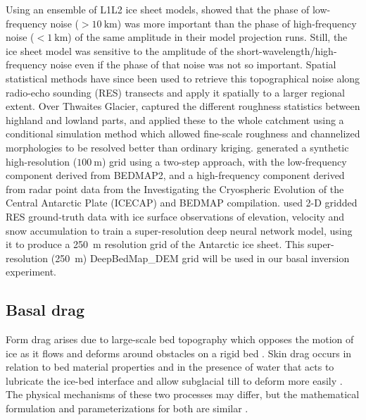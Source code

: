 Using an ensemble of L1L2 \citep{Hindmarshnumericalcomparisonapproximations2004,SchoofThinFilmFlowsWall2010} ice sheet models, \citet{SunDynamicresponseAntarctic2014} showed that the phase of low-frequency noise ($>\SI{10}{\kilo\metre}$) was more important than the phase of high-frequency noise ($<\SI{1}{\kilo\metre}$) of the same amplitude in their model projection runs.
Still, the ice sheet model was sensitive to the amplitude of the short-wavelength/high-frequency noise even if the phase of that noise was not so important.
Spatial statistical methods have since been used to retrieve this topographical noise along radio-echo sounding (\gls{RES}) transects and apply it spatially to a larger regional extent.
Over Thwaites Glacier, \citet{GoffConditionalsimulationThwaites2014} captured the different roughness statistics between highland and lowland parts, and applied these to the whole catchment using a conditional simulation method which allowed fine-scale roughness and channelized morphologies to be resolved better than ordinary kriging.
\citet{Grahamhighresolutionsyntheticbed2017} generated a synthetic high-resolution ($\SI{100}{\metre}$) grid using a two-step approach, with the low-frequency component derived from BEDMAP2, and a high-frequency component derived from radar point data from the Investigating the Cryospheric Evolution of the Central Antarctic Plate (ICECAP) and BEDMAP compilation.
\citet{LeongDeepBedMapsuperresolutiondeep2019} used 2-D gridded \gls{RES} ground-truth data with ice surface observations of elevation, velocity and snow accumulation to train a super-resolution deep neural network model, using it to produce a \SI{250}{\metre} resolution grid of the Antarctic ice sheet.
This super-resolution (\SI{250}{\metre}) DeepBedMap\_DEM grid \citep[version 1.1,][]{LeongDeepBedMap2020} will be used in our basal inversion experiment.



\subsection{Basal drag}


Form drag arises due to large-scale bed topography which opposes the motion of ice as it flows and deforms around obstacles on a rigid bed \citep[][]{WeertmanSlidingGlaciers1957,SchoofBasalperturbationsice2002}.
Skin drag occurs in relation to bed material properties and in the presence of water that acts to lubricate the ice-bed interface and allow subglacial till to deform more easily \citep{IversonExperimentsdynamicssedimentary2015}.
The physical mechanisms of these two processes may differ, but the mathematical formulation and parameterizations for both are similar \citep{Minchewuniversalglacierslip2020}.

